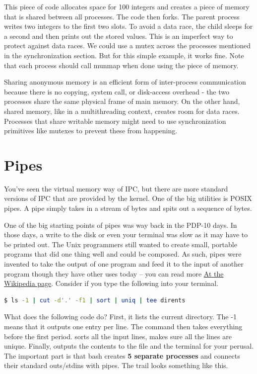 This piece of code allocates space for 100 integers and creates a piece of memory that is shared between all processes.
The code then forks.
The parent process writes two integers to the first two slots.
To avoid a data race, the child sleeps for a second and then prints out the stored values.
This is an imperfect way to protect against data races.
We could use a mutex across the processes mentioned in the synchronization section.
But for this simple example, it works fine.
Note that each process should call munmap when done using the piece of memory.
	 
Sharing anonymous memory is an efficient form of inter-process communication because there is no copying, system call, or disk-access overhead - the two processes share the same physical frame of main memory.
On the other hand, shared memory, like in a multithreading context, creates room for data races.
Processes that share writable memory might need to use synchronization primitives like mutexes to prevent these from happening.
	 
\section{Pipes}
	 
You've seen the virtual memory way of IPC, but there are more standard versions of IPC that are provided by the kernel.
One of the big utilities is POSIX pipes.
A pipe simply takes in a stream of bytes and spits out a sequence of bytes.
	 
One of the big starting points of pipes was way back in the PDP-10 days. In those days, a write to the disk or even your terminal was slow as it may have to be printed out.
The Unix programmers still wanted to create small, portable programs that did one thing well and could be composed.
As such, pipes were invented to take the output of one program
and feed it to the input of another program though they have other uses today -- you can read more \href{https://en.wikipedia.org/wiki/Pipeline\_\%28Unix\%29}{At the Wikipedia page}.
Consider if you type the following into your terminal.
	 
\begin{lstlisting}[language=bash]
	$ ls -1 | cut -d'.' -f1 | sort | uniq | tee dirents
\end{lstlisting}
	 
What does the following code do?
First, it lists the current directory.
The -1 means that it outputs one entry per line.
The  command then takes everything before the first period.
 sorts all the input lines,  makes sure all the lines are unique.
Finally,  outputs the contents to the file  and the terminal for your perusal.
The important part is that bash creates \textbf{5 separate processes} and connects their standard outs/stdins with pipes. The trail looks something like this.
	 

